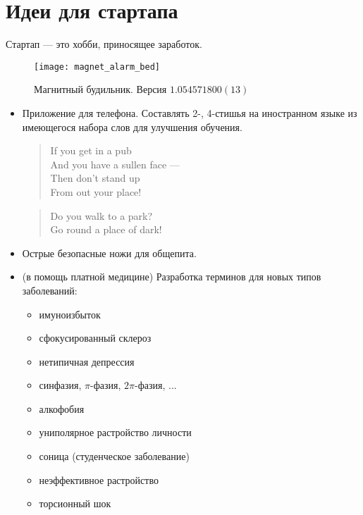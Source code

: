 \section{Идеи для стартапа}
\begin{epigraph}
    Стартап --- это хобби, приносящее заработок.
\end{epigraph}

\begin{figure}[ht!]
    \centering
    \texttt{[image: magnet\_alarm\_bed]}
    \caption{Магнитный будильник. Версия \( 1.054571800(13) \)}
\end{figure}

\begin{itemize}
    \item Приложение для телефона. Составлять 2-, 4-стишья на иностранном языке из имеющегося набора слов для улучшения обучения.
    \begin{flushleft}
        \begin{verse}
        If you get in a pub\\
        And you have a sullen face ---\\
        Then don't stand up\\
        From out your place!
        \end{verse}

        \begin{verse}
        Do you walk to a park?\\
        Go round a place of dark!
        \end{verse}
    \end{flushleft}
    \item Острые безопасные ножи для общепита.

    \item (в помощь платной медицине) Разработка терминов для новых типов заболеваний:
        \begin{itemize}
            \item имуноизбыток
            \item сфокусированный склероз
            \item нетипичная депрессия
            \item синфазия, $\pi$-фазия, $2\pi$-фазия, ...
            \item алкофобия
            \item униполярное растройство личности
            \item соница (студенческое заболевание)
            \item неэффективное растройство
            \item торсионный шок
        \end{itemize}


\end{itemize}
